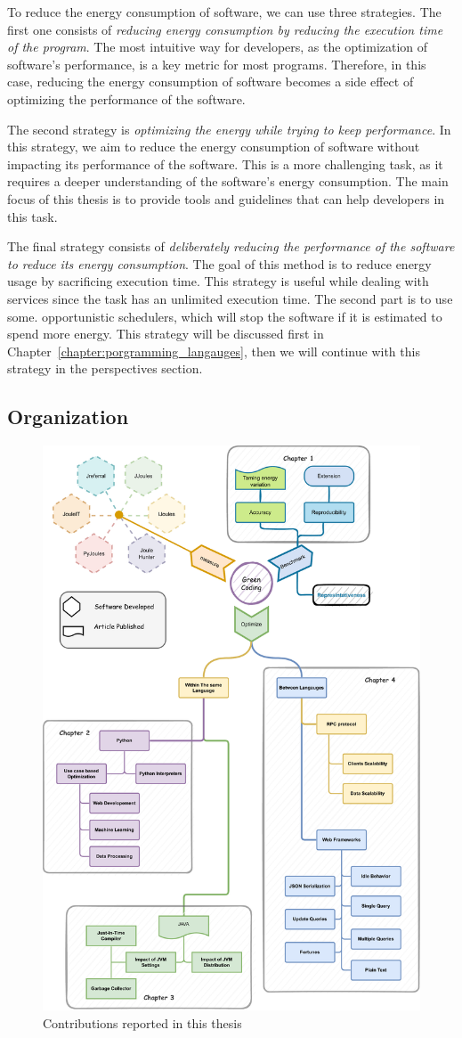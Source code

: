 To reduce the energy consumption of software, we can use three strategies.
The first one consists of \emph{reducing energy consumption by reducing the execution time of the program}.
The most intuitive way for developers, as the optimization of software's performance, is a key metric for most programs.
Therefore, in this case, reducing the energy consumption of software becomes a side effect of optimizing the performance of the software.

The second strategy is \emph{optimizing the energy while trying to keep performance}.
In this strategy, we aim to reduce the energy consumption of software without impacting its performance of the software.
This is a more challenging task, as it requires a deeper understanding of the software's energy consumption.
The main focus of this thesis is to provide tools and guidelines that can help developers in this task.

The final strategy consists of \emph{deliberately reducing the performance of the software to reduce its energy consumption}.
The goal of this method is to reduce energy usage by sacrificing execution time.
This strategy is useful while dealing with services since the task has an unlimited execution time.
The second part is to use some. opportunistic schedulers, which will stop the software if it is estimated to spend more energy.
This strategy will be discussed first in Chapter~\ref{chapter:porgramming_langauges}, then we will continue with this strategy in the perspectives section.

\subsection{Organization}
\begin{figure}[!h]
    \centering
    \includegraphics[width=.7\textwidth,height=\textheight,keepaspectratio]{chapters/thesis_contributions.pdf}
    \caption{Contributions reported in this thesis}
    \label{fig:thesis_contributions}
\end{figure}


